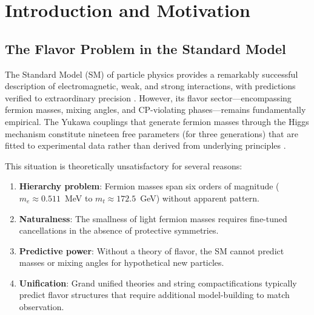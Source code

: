\documentclass[12pt, a4paper]{article}
\theoremstyle{definition}
\begin{document}
\begin{abstract}
The framework predicts a falsifiable Planck-scale Lorentz invariance violation: anisotropic muon decay with amplitude $\eta = (2\pi)^{-1}(r/R_t)(\alpha/\pi)(\Lambda_3/\sqrt{Tw}) \approx 1.18\times 10^{-4}$, testable in polarized beam experiments. We provide explicit error analysis, discuss the domain of validity of approximations, and outline the path toward full 3D lattice numerical evaluations of the helical Dirac operator.
\end{abstract}

\section{Introduction and Motivation}
\label{sec:intro}

\subsection{The Flavor Problem in the Standard Model}
The Standard Model (SM) of particle physics provides a remarkably successful description of electromagnetic, weak, and strong interactions, with predictions verified to extraordinary precision \cite{pdg}. However, its flavor sector---encompassing fermion masses, mixing angles, and CP-violating phases---remains fundamentally empirical. The Yukawa couplings that generate fermion masses through the Higgs mechanism constitute nineteen free parameters (for three generations) that are fitted to experimental data rather than derived from underlying principles \cite{grinstein,ramond}.

This situation is theoretically unsatisfactory for several reasons:
\begin{enumerate}[label=(\roman*)]
    \item \textbf{Hierarchy problem}: Fermion masses span six orders of magnitude ($m_e \approx 0.511$~MeV to $m_t \approx 172.5$~GeV) without apparent pattern.
    \item \textbf{Naturalness}: The smallness of light fermion masses requires fine-tuned cancellations in the absence of protective symmetries.
    \item \textbf{Predictive power}: Without a theory of flavor, the SM cannot predict masses or mixing angles for hypothetical new particles.
    \item \textbf{Unification}: Grand unified theories and string compactifications typically predict flavor structures that require additional model-building to match observation.
\end{enumerate}
\end{document}

